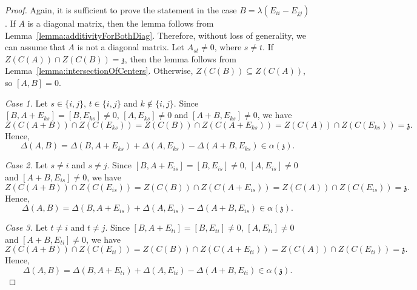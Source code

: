 \documentclass[a4paper,reqno,12pt]{amsart}
\theoremstyle{definition}
\theoremstyle{remark}
\def\zzz{\mathfrak{z}}
\begin{document}
	\begin{proof}
		Again, it is sufficient to prove the statement in the case $B = \lambda (E_{ii} - E_{jj})$. If $A$ is a diagonal matrix, then the lemma follows from Lemma~\ref{lemma:additivityForBothDiag}. Therefore, without loss of generality, we can assume that $A$ is not a diagonal matrix. Let $A_{st} \neq 0$, where $s \neq t$. If $Z(C(A)) \cap Z(C(B)) = \zzz$, then the lemma follows from Lemma~\ref{lemma:intersectionOfCenters}. Otherwise, $Z(C(B)) \subseteq Z(C(A))$, so $[A, B] = 0$.

		\textit{Case 1.} Let $s \in \lbrace i, j \rbrace$, $t \in \lbrace i, j \rbrace$ and $k \not\in \lbrace i, j \rbrace$. Since $[B, A + E_{ks}] = [B, E_{ks}] \neq 0$, $[A, E_{ks}] \neq 0$ and $[A + B, E_{ks}] \neq 0$, we have
		\begin{equation*}
			Z(C(A + B)) \cap Z(C(E_{ks})) = Z(C(B)) \cap Z(C(A + E_{ks})) = Z(C(A)) \cap Z(C(E_{ks})) = \zzz.
		\end{equation*}
		Hence,
		\begin{equation*}
			\Delta(A, B) = \Delta(B, A + E_{ks}) + \Delta(A, E_{ks}) - \Delta(A + B, E_{ks}) \in \alpha(\zzz).
		\end{equation*}

		\textit{Case 2.} Let $s \neq i$ and $s \neq j$. Since $[B, A + E_{is}] = [B, E_{is}] \neq 0$, $[A, E_{is}] \neq 0$ and $[A + B, E_{is}] \neq 0$, we have
		\begin{equation*}
			Z(C(A + B)) \cap Z(C(E_{is})) = Z(C(B)) \cap Z(C(A + E_{is})) = Z(C(A)) \cap Z(C(E_{is})) = \zzz.
		\end{equation*}
		Hence,
		\begin{equation*}
			\Delta(A, B) = \Delta(B, A + E_{is}) + \Delta(A, E_{is}) - \Delta(A + B, E_{is}) \in \alpha(\zzz).
		\end{equation*}
		
		\textit{Case 3.} Let $t \neq i$ and $t \neq j$. Since $[B, A + E_{ti}] = [B, E_{ti}] \neq 0$, $[A, E_{ti}] \neq 0$ and $[A + B, E_{ti}] \neq 0$, we have
		\begin{equation*}
			Z(C(A + B)) \cap Z(C(E_{ti})) = Z(C(B)) \cap Z(C(A + E_{ti})) = Z(C(A)) \cap Z(C(E_{ti})) = \zzz.
		\end{equation*}
		Hence,
		\begin{equation*}
			\Delta(A, B) = \Delta(B, A + E_{ti}) + \Delta(A, E_{ti}) - \Delta(A + B, E_{ti}) \in \alpha(\zzz).
		\end{equation*}
	\end{proof}
\end{document}
